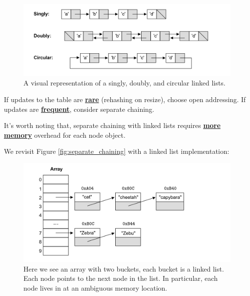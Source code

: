 \begin{figure}[ht!]

    \centering
    \includegraphics[width=\textwidth]{Sections/hash/linked_list.png}
    \caption{A visual representation of a singly, doubly, and circular linked lists.}
    \label{fig:linked_list}
\end{figure}

\begin{theo}

    \label{thm:open_addressing_vs_separate_chaining}
    
    If updates to the table are \underline{\textbf{rare}} (rehashing on resize), choose open addressing.
    If updates are \underline{\textbf{frequent}}, consider separate chaining.

    It's worth noting that, separate chaining with linked lists requires \textbf{\underline{more memory}} overhead for each node object.
\end{theo}

\newpage
\noindent
We revisit Figure \ref{fig:separate_chaining} with a linked list implementation:

\vspace{-.5em}
\begin{figure}[ht!]

    \centering
    \includegraphics[width=\textwidth]{Sections/hash/separate_chaining_linked_list.png}
    \caption{Here we see an array with two buckets, each bucket is a linked list. Each node points to the next node in 
    the list. In particular, each node lives in at an ambiguous memory location.}
    \label{fig:separate_chaining_linked_list}
\end{figure}

